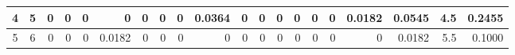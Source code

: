 \begin{table}[ht]
\begin{adjustbox}{width = \textwidth, center}
\begin{tabular}{|cc|r|r|r|r|r|r|r|r|r|r|r|r|r|r|r|rrr|}
        \rowcolor[HTML]{FFFFFF} 
        \cellcolor[HTML]{C9DAF8}\text{~~}4\text{~~}            & \cellcolor[HTML]{EBF1FC}5           & 0                                              & 0                                              & 0                                              & 0                                              & 0                                              & 0                                              & 0                                              & \cellcolor[HTML]{BCE4D1}0.0364                  & 0                                               & 0                                               & 0                                               & 0                                               & 0                                               & 0                                               & \cellcolor[HTML]{DEF2E8}0.0182                  & \multicolumn{1}{r|}{\cellcolor[HTML]{D9D2E9}0.0545}                                   & \multicolumn{1}{r|}{\cellcolor[HTML]{D9D2E9}4.5}                        & \cellcolor[HTML]{D9D2E9}0.2455                                                              \\ \hline
        \rowcolor[HTML]{FFFFFF} 
        \cellcolor[HTML]{C9DAF8}5            & \cellcolor[HTML]{EBF1FC}6           & 0                                              & 0                                              & 0                                              & \cellcolor[HTML]{DEF2E8}0.0182                 & 0                                              & 0                                              & 0                                              & 0                                               & 0                                               & 0                                               & 0                                               & 0                                               & 0                                               & 0                                               & 0                                               & \multicolumn{1}{r|}{\cellcolor[HTML]{D9D2E9}0.0182}                                   & \multicolumn{1}{r|}{\cellcolor[HTML]{D9D2E9}5.5}                        & \cellcolor[HTML]{D9D2E9}0.1000                                                              \\ \hline

\end{tabular}
\end{adjustbox}
\end{table}
